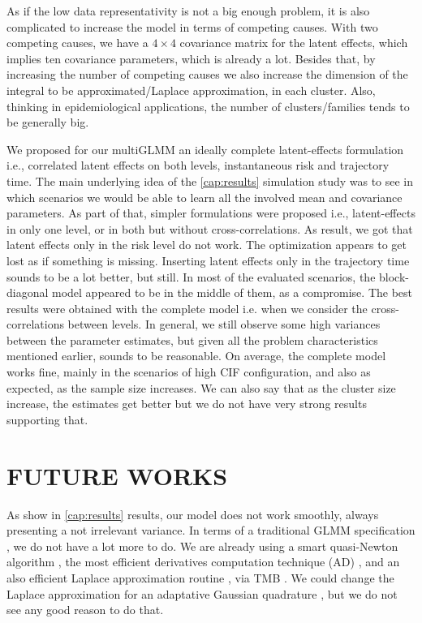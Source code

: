 As if the low data representativity is not a big enough problem, it is
also complicated to increase the model in terms of competing
causes. With two competing causes, we have a \(4\times4\) covariance
matrix for the latent effects, which implies ten covariance parameters,
which is already a lot. Besides that, by increasing the number of
competing causes we also increase the dimension of the integral to be
approximated/Laplace approximation, in each cluster. Also, thinking in
epidemiological applications, the number of clusters/families tends to
be generally big.

We proposed for our multiGLMM an ideally complete latent-effects
formulation i.e., correlated latent effects on both levels,
instantaneous risk and trajectory time. The main underlying idea of the
\autoref{cap:results} simulation study was to see in which scenarios
we would be able to learn all the involved mean and covariance
parameters. As part of that, simpler formulations were proposed i.e.,
latent-effects in only one level, or in both but without
cross-correlations. As result, we got that latent effects only in the
risk level do not work. The optimization appears to get lost as if
something is missing. Inserting latent effects only in the trajectory
time sounds to be a lot better, but still. In most of the evaluated
scenarios, the block-diagonal model appeared to be in the middle of
them, as a compromise. The best results were obtained with the complete
model i.e. when we consider the cross-correlations between levels. In
general, we still observe some high variances between the parameter
estimates, but given all the problem characteristics mentioned earlier,
sounds to be reasonable. On average, the complete model works fine,
mainly in the scenarios of high CIF configuration, and also as expected,
as the sample size increases. We can also say that as the cluster size
increase, the estimates get better but we do not have very strong
results supporting that.

\section{FUTURE WORKS}
\label{cap:future}

As show in \autoref{cap:results} results, our model does not work
smoothly, always presenting a not irrelevant variance. In terms of a
traditional GLMM specification \cite{GLMM}, we do not have a lot more to
do. We are already using a smart quasi-Newton algorithm
\cite{PORTpaper}, the most efficient derivatives computation technique
(AD) \cite{peyre}, and an also efficient Laplace approximation routine
\cite{corestats, patrao}, via TMB \cite{TMB}. We could change the
Laplace approximation for an adaptative Gaussian quadrature
\cite{quadrature}, but we do not see any good reason to do that.

